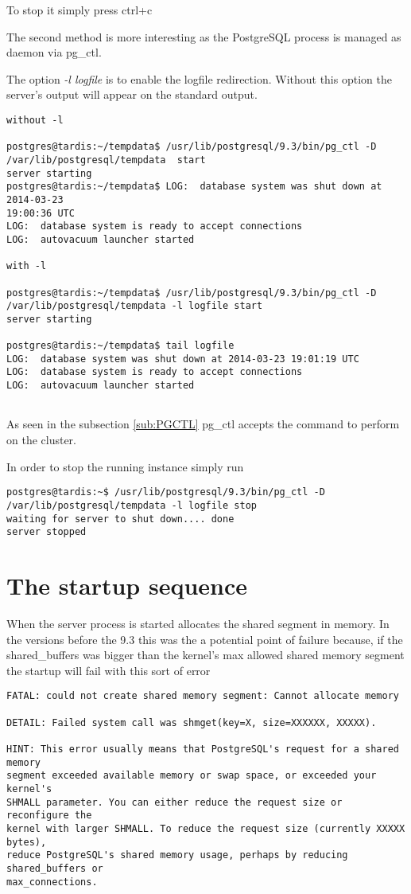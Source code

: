 To stop it simply press ctrl+c

The second method is more interesting as the PostgreSQL process is managed as 
daemon via pg\_ctl.

The option \textit{-l logfile} is to enable the logfile redirection. Without 
this option the server's output will appear on the standard output.

\begin{verbatim}
without -l

postgres@tardis:~/tempdata$ /usr/lib/postgresql/9.3/bin/pg_ctl -D 
/var/lib/postgresql/tempdata  start
server starting
postgres@tardis:~/tempdata$ LOG:  database system was shut down at 2014-03-23 
19:00:36 UTC
LOG:  database system is ready to accept connections
LOG:  autovacuum launcher started

with -l 

postgres@tardis:~/tempdata$ /usr/lib/postgresql/9.3/bin/pg_ctl -D 
/var/lib/postgresql/tempdata -l logfile start
server starting

postgres@tardis:~/tempdata$ tail logfile 
LOG:  database system was shut down at 2014-03-23 19:01:19 UTC
LOG:  database system is ready to accept connections
LOG:  autovacuum launcher started


\end{verbatim}

As seen in the  subsection \ref{sub:PGCTL} pg\_ctl accepts the command to 
perform on the cluster.

In order to stop the running instance simply run
\begin{verbatim}
postgres@tardis:~$ /usr/lib/postgresql/9.3/bin/pg_ctl -D 
/var/lib/postgresql/tempdata -l logfile stop
waiting for server to shut down.... done
server stopped

\end{verbatim}

\section{The startup sequence}
\label{sec:STARTUP}

When the server process is started allocates the shared segment in memory. In
the versions before the 9.3 this was the a potential point of failure because,
if the shared\_buffers was bigger than the kernel's max allowed shared memory
segment the startup will fail with this sort of error

\begin{verbatim}
FATAL: could not create shared memory segment: Cannot allocate memory

DETAIL: Failed system call was shmget(key=X, size=XXXXXX, XXXXX).

HINT: This error usually means that PostgreSQL's request for a shared memory
segment exceeded available memory or swap space, or exceeded your kernel's
SHMALL parameter. You can either reduce the request size or reconfigure the
kernel with larger SHMALL. To reduce the request size (currently XXXXX bytes),
reduce PostgreSQL's shared memory usage, perhaps by reducing shared_buffers or
max_connections.
\end{verbatim}

